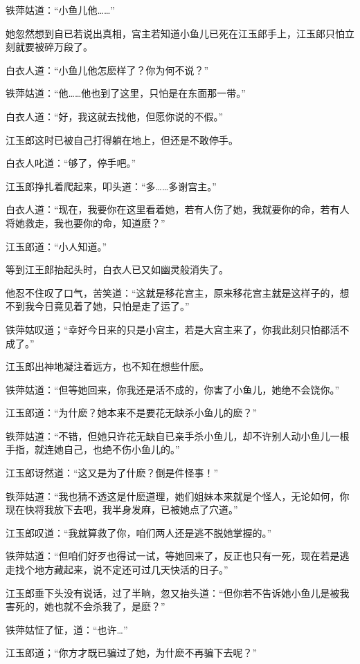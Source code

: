 \documentclass[12pt,oneside]{book}
\begin{document}
铁萍姑道：``小鱼儿他\ldots\ldots{}''

她忽然想到自已若说出真相，宫主若知道小鱼儿已死在江玉郎手上，江玉郎只怕立刻就要被碎万段了。

白衣人道：``小鱼儿他怎麽样了？你为何不说？''

铁萍姑道：``他\ldots\ldots 他也到了这里，只怕是在东面那一带。''

白衣人道：``好，我这就去找他，但愿你说的不假。''

江玉郎这时已被自己打得躺在地上，但还是不敢停手。

白衣人叱道：``够了，停手吧。''

江玉郎挣扎着爬起来，叩头道：``多\ldots\ldots 多谢宫主。''

白衣人道：``现在，我要你在这里看着她，若有人伤了她，我就要你的命，若有人将她救走，我也要你的命，知道麽？''

江玉郎道：``小人知道。''

等到江王郎抬起头时，白衣人已又如幽灵般消失了。

他忍不住叹了口气，苦笑道：``这就是移花宫主，原来移花宫主就是这样子的，想不到我今日竟见着了她，只怕是走了运了。''

铁萍姑叹道；``幸好今日来的只是小宫主，若是大宫主来了，你我此刻只怕都活不成了。''

江玉郎出神地凝注着远方，也不知在想些什麽。

铁萍姑道：``但等她回来，你我还是活不成的，你害了小鱼儿，她绝不会饶你。''

江玉郎道：``为什麽？她本来不是要花无缺杀小鱼儿的麽？''

铁萍姑道：``不错，但她只许花无缺自已亲手杀小鱼儿，却不许别人动小鱼儿一根手指，就连她自己，也绝不伤小鱼儿的。''

江玉郎讶然道：``这又是为了什麽？倒是件怪事！''

铁萍姑道：``我也猜不透这是什麽道理，她们姐妹本来就是个怪人，无论如何，你现在快将我放下去吧，我半身发麻，已被她点了穴道。''

江玉郎叹道：``我就算救了你，咱们两人还是逃不脱她掌握的。''

铁萍姑道：``但咱们好歹也得试一试，等她回来了，反正也只有一死，现在若是逃走找个地方藏起来，说不定还可过几天快活的日子。''

江玉郎垂下头没有说话，过了半晌，忽又抬头道：``但你若不告诉她小鱼儿是被我害死的，她也就不会杀我了，是麽？''

铁萍姑怔了怔，道：``也许\ldots{}''

江玉郎道；``你方才既已骗过了她，为什麽不再骗下去呢？''
\end{document}
